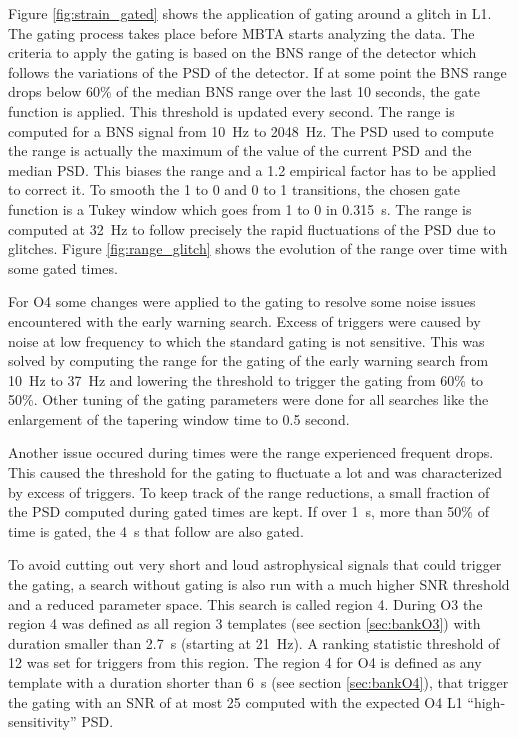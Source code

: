 Figure \ref{fig:strain_gated} shows the application of gating around a glitch in L1.
The gating process takes place before MBTA starts analyzing the data.
The criteria to apply the gating is based on the BNS range of the detector which follows the variations of the PSD of the detector.
If at some point the BNS range drops below 60\% of the median BNS range over the last 10 seconds, the gate function is applied.
This threshold is updated every second.
The range is computed for a BNS signal from \SI{10}{Hz} to \SI{2048}{\Hz}.
The PSD used to compute the range is actually the maximum of the value of the current PSD and the median PSD.
This biases the range and a 1.2 empirical factor has to be applied to correct it.
To smooth the 1 to 0 and 0 to 1 transitions, the chosen gate function is a Tukey window which goes from 1 to 0 in \SI{0.315}{s}.
The range is computed at \SI{32}{\hertz} to follow precisely the rapid fluctuations of the PSD due to glitches.
Figure \ref{fig:range_glitch} shows the evolution of the range over time with some gated times.

For O4 some changes were applied to the gating to resolve some noise issues encountered with the early warning search.
Excess of triggers were caused by noise at low frequency  to which the standard gating is not sensitive.
This was solved by computing the range for the gating of the early warning search from \SI{10}{Hz} to \SI{37}{Hz} and lowering the threshold to trigger the gating from 60\% to 50\%.
Other tuning of the gating parameters were done for all searches like the enlargement of the tapering window time to 0.5 second.

Another issue occured during times were the range experienced frequent drops.
This caused the threshold for the gating to fluctuate a lot and was characterized by excess of triggers.
To keep track of the range reductions, a small fraction of the PSD computed during gated times are kept.
If over \SI{1}{s}, more than 50\% of time is gated, the \SI{4}{s} that follow are also gated.

To avoid cutting out very short and loud astrophysical signals that could trigger the gating, a search without gating is also run with a much higher SNR threshold and a reduced parameter space.
This search is called region 4.
During O3 the region 4 was defined as all region 3 templates (see section \ref{sec:bankO3}) with duration smaller than \SI{2.7}{s} (starting at \SI{21}{\hertz}).
A ranking statistic threshold of 12 was set for triggers from this region.
The region 4 for O4 is defined as any template with a duration shorter than \SI{6}{s} (see section \ref{sec:bankO4}), that trigger the gating with an SNR of at most 25 computed with the expected O4 L1 ``high-sensitivity'' PSD.

